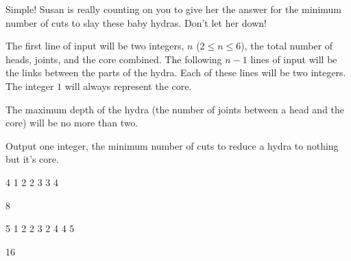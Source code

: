 Simple!
Susan is really counting on you to give her the answer for the minimum number of cuts to slay these baby hydras.
Don't let her down!

\begin{formalin}
The first line of input will be two integers, $n$ ($2 \leq n \leq 6$), the total number of heads, joints, and the core combined.
The following $n-1$ lines of input will be the links between the parts of the hydra.
Each of these lines will be two integers.
The integer $1$ will always represent the core.

The maximum depth of the hydra (the number of joints between a head and the core) will be no more than two.
\end{formalin}

\begin{formalout}
Output one integer, the minimum number of cuts to reduce a hydra to nothing but it's core.
\end{formalout}

\begin{datain}
4
1 2
2 3
3 4
\end{datain}
\begin{dataout}
8
\end{dataout}

\begin{datain}
5
1 2
2 3
2 4
4 5
\end{datain}
\begin{dataout}
16
\end{dataout}
